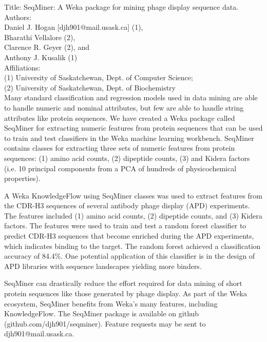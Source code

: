 \documentclass{article}
\begin{document}
\noindent Title: SeqMiner: A Weka package for mining phage display sequence data. \\
Authors: \\
\indent Daniel J. Hogan [djh901@mail.usask.ca] (1), \\
\indent Bharathi Vellalore (2), \\
\indent Clarence R. Geyer (2), and \\
\indent Anthony J. Kusalik (1) \\
Affiliations: \\
\indent(1) University of Saskatchewan, Dept. of Computer Science; \\
\indent(2) University of Saskatchewan, Dept. of Biochemistry \\

Many standard classification and regression models used in data mining are able to handle numeric and nominal attributes, but few are able to handle string attributes like protein sequences. We have created a Weka package called SeqMiner for extracting numeric features from protein sequences that can be used to train and test classifiers in the Weka machine learning workbench. SeqMiner contains classes for extracting three sets of numeric features from protein sequences: (1) amino acid counts, (2) dipeptide counts, (3) and Kidera factors (i.e. 10 principal components from a PCA of hundreds of physicochemical properties). 

A Weka KnowledgeFlow using SeqMiner classes was used to extract features from the CDR-H3 sequences of several antibody phage display (APD) experiments. The features included (1) amino acid counts, (2) dipeptide counts, and (3) Kidera factors. The features were used to train and test a random forest classifier to predict CDR-H3 sequences that become enriched during the APD experiments, which indicates binding to the target. The random forest achieved a classification accuracy of 84.4\%. One potential application of this classifier is in the design of APD libraries with sequence landscapes yielding more binders.

SeqMiner can drastically reduce the effort required for data mining of short protein sequences like those generated by phage display. As part of the Weka ecosystem, SeqMiner benefits from Weka's many features, including KnowledgeFlow. The SeqMiner package is available on github (github.com/djh901/seqminer). Feature requests may be sent to djh901@mail.usask.ca.

\end{document}
